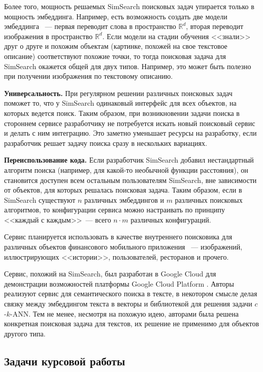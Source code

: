 \documentclass[a4paper,12pt]{extarticle}
\begin{document}
Более того, мощность решаемых SimSearch поисковых задач упирается только в мощность эмбеддинга. Например, есть возможность создать две модели эмбеддинга ~--- первая переводит слова в пространство $\mathbb{R}^d$, вторая переводит изображения в пространство $\mathbb{R}^d$. Если модели на стадии обучения <<знали>> друг о друге и похожим объектам (картинке, похожей на свое текстовое описание) соответствуют похожие точки, то тогда поисковая задача для SimSearch окажется общей для двух типов. Например, это может быть полезно при получении изображения по текстовому описанию.

\textbf{Универсальность.} При регулярном решении различных поисковых задач поможет то, что у SimSearch одинаковый интерфейс для всех объектов, на которых ведется поиск. Таким образом, при возникновении задачи поиска в стороннем сервисе разработчику не потребуется искать новый поисковый сервис и делать с ним интеграцию. Это заметно уменьшает ресурсы на разработку, если разработчик решает задачу поиска сразу в нескольких вариациях.

\textbf{Переиспользование кода.} Если разработчик SimSearch добавил нестандартный алгоритм поиска (например, для какой-то необычной функции расстояния), он становится доступен всем остальным пользователям SimSearch, вне зависимости от объектов, для которых решалась поисковая задача. Таким образом, если в SimSearch существуют $n$ различных эмбеддингов и $m$ различных поисковых алгоритмов, то конфигурации сервиса можно настраивать по принципу <<каждый с каждым>>~--- всего $n \cdot m$ различных конфигураций. 

Сервис планируется использовать в качестве внутреннего поисковика для различных объектов финансового мобильного приложения ~--- изображений, иллюстрирующих <<истории>>, пользователей, ресторанов и прочего.

Сервис, похожий на SimSearch, был разработан в Google Cloud для демонстрации возможностей платформы Google Cloud Platform \cite{googlerealtimeembeddings}. Авторы реализуют сервис для семантического поиска в тексте, в некотором смысле делая связку между эмбеддингом текста в векторы и библиотекой для решения задачи $c$-$k$-ANN. Тем не менее, несмотря на похожую идею, авторами была решена конкретная поисковая задача для текстов, их решение не применимо для объектов другого типа.


\subsection{Задачи курсовой работы}
\end{document}

